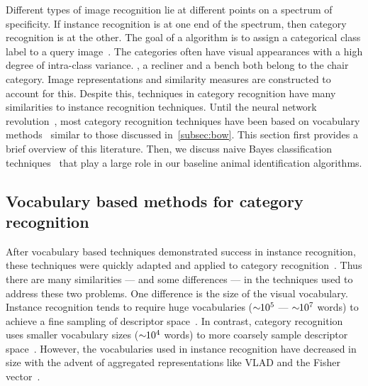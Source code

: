     Different types of image recognition lie at different points on a spectrum of specificity. If instance
    recognition is at one end of the spectrum, then category recognition is at the other. The goal of a
     algorithm is to assign a categorical class label to a query
    image~\cite{everingham_pascal_2010, everingham_pascal_2015, russakovsky_imagenet_2014, deng_imagenet_2009,
    fei_fei_one_shot_2006, griffin_caltech_256_2007}. The categories often have visual appearances with a high
    degree of intra-class variance. \Eg{}, a recliner and a bench both belong to the chair category. Image
    representations and similarity measures are constructed to account for this. Despite this, techniques in
    category recognition have many similarities to instance recognition techniques. Until the neural network
    revolution~\cite{krizhevsky_imagenet_2012}, most category recognition techniques have been based on vocabulary
    methods~\cite{csurka_visual_2004, yang_linear_2009, sanchez_compressed_2013, russakovsky_imagenet_2014,
    krizhevsky_imagenet_2012} similar to those discussed in~\cref{subsec:bow}. This section first provides a brief
    overview of this literature. Then, we discuss naive Bayes classification
    techniques~\cite{boiman_defense_2008,mccann_local_2012} that play a large role in our baseline animal
    identification algorithms.

    \subsection{Vocabulary based methods for category recognition}
        After vocabulary based techniques demonstrated success in instance recognition, these techniques were
        quickly adapted and applied to category recognition~\cite{csurka_visual_2004}. Thus there are many
        similarities --- and some differences --- in the techniques used to address these two problems. One
        difference is the size of the visual vocabulary. Instance recognition tends to require huge vocabularies
        ($\sim\mkern-6mu 10^{5}$ --- $\sim\mkern-6mu 10^{7}$ words) to achieve a fine sampling of descriptor
        space~\cite{nister_scalable_2006, philbin_object_2007}. In contrast, category recognition uses smaller
        vocabulary sizes ($\sim\mkern-6mu 10^{4}$ words) to more coarsely sample descriptor
        space~\cite{zhang_local_2006}. However, the vocabularies used in instance recognition have decreased in
        size with the advent of aggregated representations like VLAD and the Fisher
        vector~\cite{arandjelovic_all_2013, sanchez_compressed_2013}.

